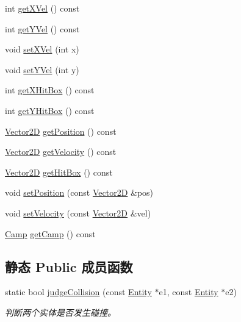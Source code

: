 \begin{DoxyCompactItemize}
\item 
int \hyperlink{class_entity_a31c55ae9457507b1c3ad5688b8f2eda2}{get\+X\+Vel} () const
\item 
int \hyperlink{class_entity_abaf01d725e35883d60f1fec3f39a8ea0}{get\+Y\+Vel} () const
\item 
void \hyperlink{class_entity_a7f20a2190046121150e5903ec769e9dc}{set\+X\+Vel} (int x)
\item 
void \hyperlink{class_entity_a9d7c4a35217e6f83ac21da314aa3ec9a}{set\+Y\+Vel} (int y)
\item 
int \hyperlink{class_entity_a5077b09978b28e502737475686ee893d}{get\+X\+Hit\+Box} () const
\item 
int \hyperlink{class_entity_ad46d1d4faf814a6b501101bc1c914754}{get\+Y\+Hit\+Box} () const
\item 
\hyperlink{_vector2_d_8hpp_aa1f1145650f1dd9bddf7335ec6434d7c}{Vector2D} \hyperlink{class_entity_a6086a606c751be107efdc29109346d32}{get\+Position} () const
\item 
\hyperlink{_vector2_d_8hpp_aa1f1145650f1dd9bddf7335ec6434d7c}{Vector2D} \hyperlink{class_entity_a3107fab87440ee7e410c4a98505dfc50}{get\+Velocity} () const
\item 
\hyperlink{_vector2_d_8hpp_aa1f1145650f1dd9bddf7335ec6434d7c}{Vector2D} \hyperlink{class_entity_a4d69956308b0a0396ddba314c0aa0972}{get\+Hit\+Box} () const
\item 
void \hyperlink{class_entity_a372b9155542c8a228a4f1305f5f67341}{set\+Position} (const \hyperlink{_vector2_d_8hpp_aa1f1145650f1dd9bddf7335ec6434d7c}{Vector2D} \&pos)
\item 
void \hyperlink{class_entity_af41c73b5b2a7e68a7f285b12d0dab9f1}{set\+Velocity} (const \hyperlink{_vector2_d_8hpp_aa1f1145650f1dd9bddf7335ec6434d7c}{Vector2D} \&vel)
\item 
\hyperlink{_entity_8h_ad54c4fe39f1c51b786c24ae0b7763b44}{Camp} \hyperlink{class_entity_a80b1c04df243bcdba1225a10e54995f1}{get\+Camp} () const
\end{DoxyCompactItemize}
\subsection*{静态 Public 成员函数}
\begin{DoxyCompactItemize}
\item 
static bool \hyperlink{class_entity_afeab7f54f15446e13fbf218eccb8be53}{judge\+Collision} (const \hyperlink{class_entity}{Entity} $\ast$e1, const \hyperlink{class_entity}{Entity} $\ast$e2)
\begin{DoxyCompactList}\small\item\em 判断两个实体是否发生碰撞。 \end{DoxyCompactList}\end{DoxyCompactItemize}

